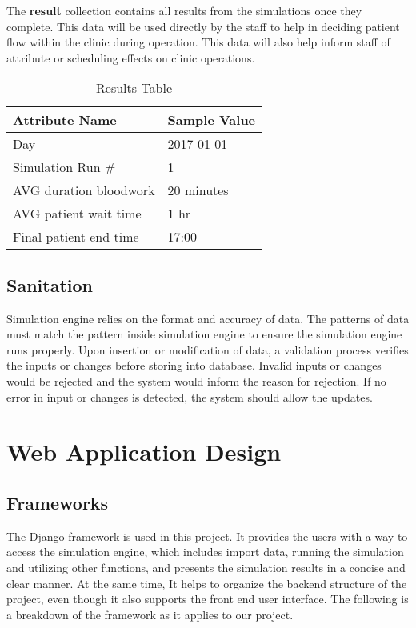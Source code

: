 \documentclass[12pt]{article}
\begin{document}
The \textbf{result} collection contains all results from the simulations once they complete. This data will be used directly by the staff to help in deciding patient flow within the clinic during operation. This data will also help inform staff of attribute or scheduling effects on clinic operations.
\begin{table}[H]
\centering
\caption{Results Table}
\label{result-table}
\begin{tabular}{|l|l|}
\hline
Attribute Name         & Sample Value \\ \hline
Day                    & 2017-01-01   \\ \hline
Simulation Run \#      & 1            \\ \hline
AVG duration bloodwork & 20 minutes   \\ \hline
AVG patient wait time  & 1 hr         \\ \hline
Final patient end time & 17:00        \\ \hline
\end{tabular}
\end{table}
\hfill

\subsection{Sanitation}
Simulation engine relies on the format and accuracy of data. The patterns of data must match the pattern inside simulation engine to ensure the simulation engine runs properly. Upon insertion or modification of data, a validation process verifies the inputs or changes before storing into database. Invalid inputs or changes would be rejected and the system would inform the reason for rejection. If no error in input or changes is detected, the system should allow the updates. 


\section{Web Application Design}

\subsection{Frameworks}
The Django framework is used in this project. It provides the users with a way to access the simulation engine, which includes import data, running the simulation and utilizing other functions, and presents the simulation results in a concise and clear manner. At the same time, It helps to organize the backend structure of the project, even though it also supports the front end user interface. The following is a breakdown of the framework as it applies to our project.
\end{document}
